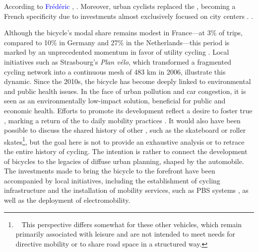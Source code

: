 \begin{refsegment}
{    According to \textcolor{blue}{Frédéric} \textcolor{blue}{\textcite[143]{heran_retour_2015}}, . Moreover, urban cyclists replaced the  \textcolor{blue}{\autocite{ambroise-rendu_creation_1976}}, becoming a French specificity due to investments almost exclusively focused on city centers \textcolor{blue}{\autocite[144]{heran_retour_2015}}.
} \textcolor{blue}{\autocite[143]{heran_retour_2015}}.%

Although the bicycle's modal share remains modest in France—at 3\% of trips, compared to 10\% in Germany and 27\% in the Netherlands—this period is marked by an unprecedented momentum in favor of utility cycling \textcolor{blue}{\autocite[222]{dauncey_french_2012}}. Local initiatives such as Strasbourg's \textsl{Plan vélo}, which transformed a fragmented cycling network into a continuous mesh of 483 km in 2006, illustrate this dynamic. Since the 2010s, the bicycle has become deeply linked to environmental and public health issues. In the face of urban pollution and car congestion, it is seen as an environmentally low-impact solution, beneficial for public and economic health. Efforts to promote its development reflect a desire to foster true  \textcolor{blue}{\autocites[4]{sebban_complementarite_2003}{heran_transition_2018}}, marking a return of the  to daily mobility practices \textcolor{blue}{\autocite[35]{papon_retour_2012}}. It would also have been possible to discuss the shared history of other , such as the skateboard or roller skates\footnote{~
    This perspective differs somewhat for these other vehicles, which remain primarily associated with leisure and are not intended to meet needs for directive mobility or to share road space in a structured way.
}, but the goal here is not to provide an exhaustive analysis or to retrace the entire history of cycling. The intention is rather to connect the development of bicycles to the legacies of diffuse urban planning, shaped by the automobile. The investments made to bring the bicycle to the forefront have been accompanied by local initiatives, including the establishment of cycling infrastructure and the installation of mobility services, such as \acrshort{PBS} systems \textcolor{blue}{\autocite[244]{dauncey_french_2012}}, as well as the deployment of electromobility.%


\end{refsegment}
